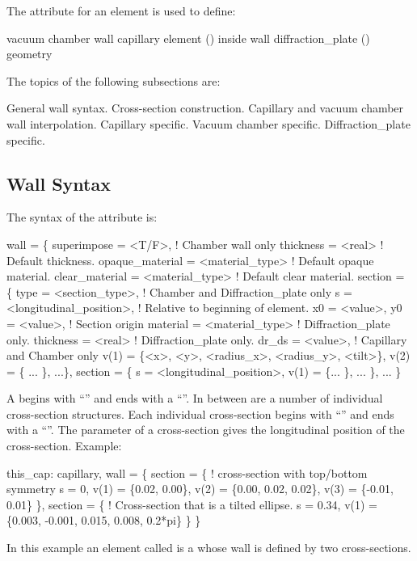 The  attribute for an element is used to define:
\begin{example}
  vacuum chamber wall
  capillary element () inside wall
  diffraction_plate () geometry
\end{example}

The topics of the following subsections are:
\begin{example}
        General wall syntax.
        Cross-section construction. 
        Capillary and vacuum chamber wall interpolation.
        Capillary specific.
        Vacuum chamber specific.
        Diffraction_plate specific.
\end{example}

\subsection{Wall Syntax}
\label{s:wall.syntax}

The syntax of the  attribute is:
\begin{example}
  wall = \{
    superimpose = <T/F>,                     ! Chamber wall only
    thickness = <real>                       ! Default thickness. 
    opaque_material = <material_type>        ! Default opaque material. 
    clear_material = <material_type>         ! Default clear material. 
    section = \{ 
      type = <section_type>,                 ! Chamber and Diffraction_plate only
      s = <longitudinal_position>,           ! Relative to beginning of element.
      x0 = <value>, y0 = <value>,            ! Section origin
      material = <material_type>             ! Diffraction_plate only.
      thickness = <real>                     ! Diffraction_plate only.
      dr_ds = <value>,                       ! Capillary and Chamber only
      v(1) = \{<x>, <y>, <radius_x>, <radius_y>, <tilt>\}, 
      v(2) = \{ ... \},
      ...\},
    section = \{
      s = <longitudinal_position>, 
      v(1) = \{... \},
      ... \},
    ... \}
\end{example}
A  begins with ``'' and ends with a
``\vn{\}}''. In between are a number of individual cross-section
structures. Each individual cross-section begins with ``'' and ends with a ``\vn{\}}''. The  parameter of a
cross-section gives the longitudinal position of the cross-section.
Example:
\begin{example}
  this_cap: capillary, 
    wall = \{   
      section = \{ ! cross-section with top/bottom symmetry
        s = 0, v(1) =  \{0.02, 0.00\}, 
        v(2) = \{0.00, 0.02, 0.02\}, v(3) = \{-0.01, 0.01\} \}, 
      section = \{  ! Cross-section that is a tilted ellipse.
        s = 0.34, 
        v(1) = \{0.003, -0.001, 0.015, 0.008, 0.2*pi\} \} \}
\end{example}
In this example an element called  is a 
whose wall is defined by two cross-sections.

